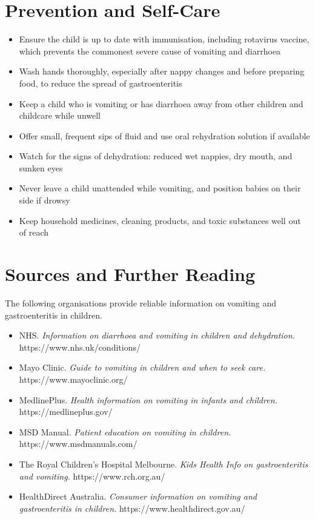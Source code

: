 \section*{Prevention and Self-Care}
\begin{itemize}
    \item Ensure the child is up to date with immunisation, including rotavirus vaccine, which prevents the commonest severe cause of vomiting and diarrhoea
    \item Wash hands thoroughly, especially after nappy changes and before preparing food, to reduce the spread of gastroenteritis
    \item Keep a child who is vomiting or has diarrhoea away from other children and childcare while unwell
    \item Offer small, frequent sips of fluid and use oral rehydration solution if available
    \item Watch for the signs of dehydration: reduced wet nappies, dry mouth, and sunken eyes
    \item Never leave a child unattended while vomiting, and position babies on their side if drowsy
    \item Keep household medicines, cleaning products, and toxic substances well out of reach
\end{itemize}

\section*{Sources and Further Reading}
The following organisations provide reliable information on vomiting and gastroenteritis in children.

\begin{itemize}
    \item NHS. \textit{Information on diarrhoea and vomiting in children and dehydration.} https://www.nhs.uk/conditions/
    \item Mayo Clinic. \textit{Guide to vomiting in children and when to seek care.} https://www.mayoclinic.org/
    \item MedlinePlus. \textit{Health information on vomiting in infants and children.} https://medlineplus.gov/
    \item MSD Manual. \textit{Patient education on vomiting in children.} https://www.msdmanuals.com/
    \item The Royal Children's Hospital Melbourne. \textit{Kids Health Info on gastroenteritis and vomiting.} https://www.rch.org.au/
    \item HealthDirect Australia. \textit{Consumer information on vomiting and gastroenteritis in children.} https://www.healthdirect.gov.au/
\end{itemize}
